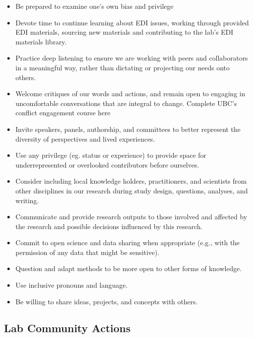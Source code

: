 \documentclass[
]{book}
\providecommand{\tightlist}{%
  \setlength{\itemsep}{0pt}\setlength{\parskip}{0pt}}
\begin{document}
\begin{itemize}
\tightlist
\item
  Be prepared to examine one's own bias and privilege
\item
  Devote time to continue learning about EDI issues, working through provided EDI materials, sourcing new materials and contributing to the lab's EDI materials library.
\item
  Practice deep listening to ensure we are working with peers and collaborators in a meaningful way, rather than dictating or projecting our needs onto others.
\item
  Welcome critiques of our words and actions, and remain open to engaging in uncomfortable conversations that are integral to change. Complete UBC's conflict engagement course here
\item
  Invite speakers, panels, authorship, and committees to better represent the diversity of perspectives and lived experiences.
\item
  Use any privilege (eg. status or experience) to provide space for underrepresented or overlooked contributors before ourselves.
\item
  Consider including local knowledge holders, practitioners, and scientists from other disciplines in our research during study design, questions, analyses, and writing.
\item
  Communicate and provide research outputs to those involved and affected by the research and possible decisions influenced by this research.
\item
  Commit to open science and data sharing when appropriate (e.g., with the permission of any data that might be sensitive).
\item
  Question and adapt methods to be more open to other forms of knowledge.
\item
  Use inclusive pronouns and language.
\item
  Be willing to share ideas, projects, and concepts with others.
\end{itemize}

\hypertarget{labactions}{%
\subsection*{Lab Community Actions}\label{labactions}}
\end{document}
